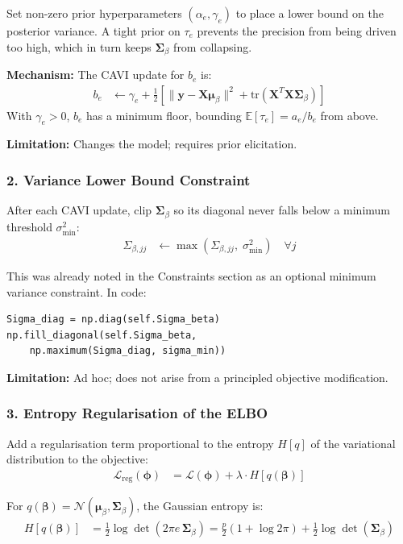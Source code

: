 \documentclass[11pt]{article}
\begin{document}
Set non-zero prior hyperparameters $(\alpha_e, \gamma_e)$ to place a lower bound on the posterior variance. A tight prior on $\tau_e$ prevents the precision from being driven too high, which in turn keeps $\bm{\Sigma}_\beta$ from collapsing.

\textbf{Mechanism:} The CAVI update for $b_e$ is:
\begin{align}
  b_e &\leftarrow \gamma_e + \frac{1}{2}\left[\|\bm{y} - \bm{X}\bm{\mu}_\beta\|^2 + \mathrm{tr}(\bm{X}^T\bm{X}\bm{\Sigma}_\beta)\right]
\end{align}
With $\gamma_e > 0$, $b_e$ has a minimum floor, bounding $\mathbb{E}[\tau_e] = a_e/b_e$ from above.

\textbf{Limitation:} Changes the model; requires prior elicitation.

\subsubsection*{2. Variance Lower Bound Constraint}

After each CAVI update, clip $\bm{\Sigma}_\beta$ so its diagonal never falls below a minimum threshold $\sigma^2_{\min}$:
\begin{align}
  \Sigma_{\beta,jj} &\leftarrow \max\!\left(\Sigma_{\beta,jj},\; \sigma^2_{\min}\right) \quad \forall j
\end{align}

This was already noted in the Constraints section as an optional minimum variance constraint. In code:
\begin{verbatim}
Sigma_diag = np.diag(self.Sigma_beta)
np.fill_diagonal(self.Sigma_beta,
    np.maximum(Sigma_diag, sigma_min))
\end{verbatim}

\textbf{Limitation:} Ad hoc; does not arise from a principled objective modification.

\subsubsection*{3. Entropy Regularisation of the ELBO}

Add a regularisation term proportional to the entropy $H[q]$ of the variational distribution to the objective:
\begin{align}
  \mathcal{L}_{\text{reg}}(\bm{\phi}) &= \mathcal{L}(\bm{\phi}) + \lambda \cdot H[q(\bm{\beta})]
\end{align}

For $q(\bm{\beta}) = \mathcal{N}(\bm{\mu}_\beta, \bm{\Sigma}_\beta)$, the Gaussian entropy is:
\begin{align}
  H[q(\bm{\beta})] &= \frac{1}{2} \log \det(2\pi e\, \bm{\Sigma}_\beta)
               = \frac{p}{2}(1 + \log 2\pi) + \frac{1}{2}\log\det(\bm{\Sigma}_\beta)
\end{align}
\end{document}
